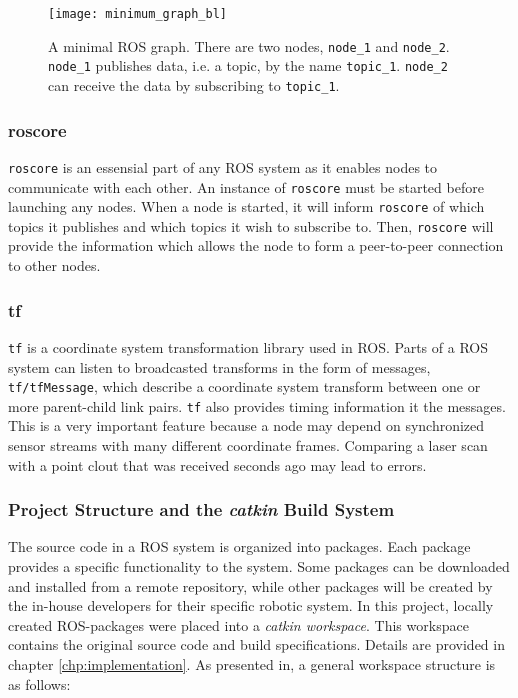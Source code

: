 \begin{figure}[h]
    \centering
    \texttt{[image: minimum\_graph\_bl]}
    \caption{A minimal \ac{ROS} graph. There are two nodes, \texttt{node\_1} and \texttt{node\_2}. \texttt{node\_1} publishes data, i.e. a topic, by the name \texttt{topic\_1}. \texttt{node\_2} can receive the data by subscribing to \texttt{topic\_1}.}
    \label{fig:minimum_graph}
\end{figure}

\subsubsection{roscore}

\texttt{roscore} is an essensial part of any \ac{ROS} system as it enables nodes to communicate with each other. An instance of \texttt{roscore} must be started before launching any nodes. When a node is started, it will inform \texttt{roscore} of which topics it publishes and which topics it wish to subscribe to. Then, \texttt{roscore} will provide the information which allows the node to form a peer-to-peer connection to other nodes.

\subsubsection{tf}

\texttt{tf}\cite{tf_paper} is a coordinate system transformation library used in \ac{ROS}. Parts of a \ac{ROS} system can listen to broadcasted transforms in the form of messages, \texttt{tf/tfMessage}, which describe a coordinate system transform between one or more parent-child link pairs. \texttt{tf} also provides timing information it the messages. This is a very important feature because a node may depend on synchronized sensor streams with many different coordinate frames. Comparing a laser scan with a point clout that was received seconds ago may lead to errors. 

\subsubsection{Project Structure and the \textit{catkin} Build System}
\label{sec:catkin}
The source code in a \ac{ROS} system is organized into packages. Each package provides a specific functionality to the system. Some packages can be downloaded and installed from a remote repository, while other packages will be created by the in-house developers for their specific robotic system. In this project, locally created ROS-packages were placed into a \textit{catkin workspace}. This workspace contains the  original source code and build specifications. Details are provided in chapter \ref{chp:implementation}. As presented in\cite{ROS_tut_pkg}, a general workspace structure is as follows:

